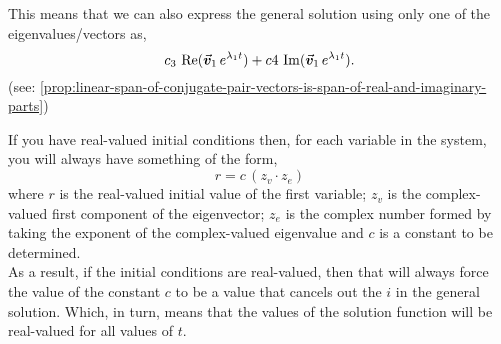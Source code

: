 \documentclass[../MathsNotesBase.tex]{subfiles}
\begin{document}
{		This means that we can also express the general solution using only one of the eigenvalues/vectors as,
		\[ c_3 \, \operatorname{Re}(\vec{\bm{v}}_1 \, e^{\lambda_1 t}) + c4 \, \operatorname{Im}(\vec{\bm{v}}_1 \, e^{\lambda_1 t}). \]
		(see: \ref{prop:linear-span-of-conjugate-pair-vectors-is-span-of-real-and-imaginary-parts})
		
		\biggerskip
		If you have real-valued initial conditions then, for each variable in the system, you will always have something of the form,
		\[ r = c \, (z_{v} \cdot z_{e}) \]
		where $r$ is the real-valued initial value of the first variable; $z_{v}$ is the complex-valued first component of the eigenvector; $z_{e}$ is the complex number formed by taking the exponent of the complex-valued eigenvalue and $c$ is a constant to be determined.\\
		
		As a result, if the initial conditions are real-valued, then that will always force the value of the constant $c$ to be a value that cancels out the $i$ in the general solution. Which, in turn, means that the values of the solution function will be real-valued for all values of $t$.


}
\end{document}
